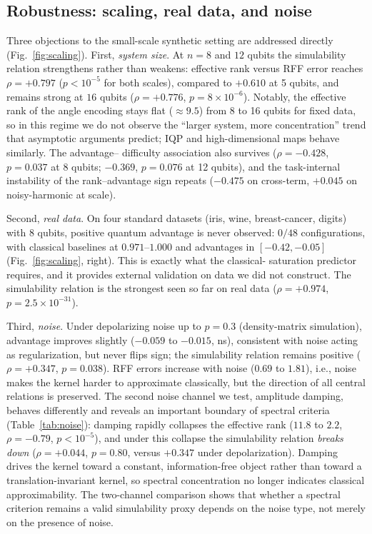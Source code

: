 \documentclass[aps,pra,preprint]{revtex4-2}
\begin{document}
\subsection{Robustness: scaling, real data, and noise}
\label{sec:robustness}

Three objections to the small-scale synthetic setting are addressed directly (Fig.~\ref{fig:scaling}).
First, \emph{system size}. At $n=8$ and $12$ qubits the simulability relation strengthens
rather than weakens: effective rank versus RFF error reaches $\rho=+0.797$ ($p<10^{-5}$
for both scales), compared to $+0.610$ at 5 qubits, and remains strong at $16$ qubits
($\rho=+0.776$, $p=8\times10^{-6}$). Notably, the effective rank of the
angle encoding stays flat ($\approx9.5$) from 8 to 16 qubits for fixed data, so in this
regime we do not observe the ``larger system, more concentration'' trend that asymptotic
arguments predict; IQP and high-dimensional maps behave similarly. The advantage--
difficulty association also survives ($\rho=-0.428$, $p=0.037$ at 8 qubits; $-0.369$,
$p=0.076$ at 12 qubits), and the task-internal instability of the rank--advantage sign
repeats ($-0.475$ on cross-term, $+0.045$ on noisy-harmonic at scale).

Second, \emph{real data}. On four standard datasets (iris, wine, breast-cancer,
digits) with 8 qubits, positive quantum advantage is never observed: $0/48$
configurations, with classical baselines at $0.971$--$1.000$ and advantages in
$[-0.42,-0.05]$ (Fig.~\ref{fig:scaling}, right). This is exactly what the classical-
saturation predictor requires, and it provides external validation on data we did not
construct. The simulability relation is the strongest seen so far on real data
($\rho=+0.974$, $p=2.5\times10^{-31}$).

Third, \emph{noise}. Under depolarizing noise up to $p=0.3$ (density-matrix simulation),
advantage improves slightly ($-0.059$ to $-0.015$, ns), consistent with noise acting as
regularization, but never flips sign; the simulability relation remains positive
($\rho=+0.347$, $p=0.038$). RFF errors increase with noise ($0.69$ to $1.81$), i.e.,
noise makes the kernel harder to approximate classically, but the direction of all
central relations is preserved. The second noise channel we test, amplitude damping,
behaves differently and reveals an important boundary of spectral criteria
(Table~\ref{tab:noise}): damping rapidly collapses the effective rank ($11.8$ to $2.2$,
$\rho=-0.79$, $p<10^{-5}$), and under this collapse the simulability relation
\emph{breaks down} ($\rho=+0.044$, $p=0.80$, versus $+0.347$ under depolarization).
Damping drives the kernel toward a constant, information-free object rather than toward
a translation-invariant kernel, so spectral concentration no longer indicates classical
approximability. The two-channel comparison shows that whether a spectral criterion
remains a valid simulability proxy depends on the noise type, not merely on the
presence of noise.
\end{document}
